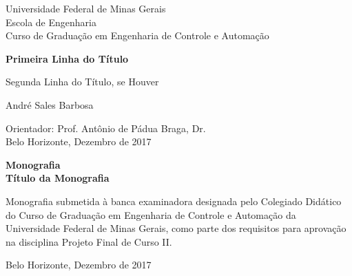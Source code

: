 \begin{titlepage}
\begin{center}
{\large Universidade Federal de Minas Gerais\\
Escola de Engenharia \\
Curso de Graduação em Engenharia de Controle e Automação\\}

\vspace{6cm}
{\bf\Large Primeira Linha do Título\vspace{0.2cm}

Segunda Linha do Título, se Houver}
\vspace{4cm}

{\large André Sales Barbosa}
\vspace{2cm}  
   
\vspace{2cm}          
{\large Orientador: Prof. Antônio de Pádua Braga, Dr.}\\


\vfill
{\large Belo Horizonte, Dezembro de 2017 }
\end{center}

\end{titlepage}

\newpage
\clearpage
\thispagestyle{empty}


\begin{titlepage}

\centering
\textbf{Monografia}\\
\vspace{2cm}
\centering
\textbf{Título da Monografia}\\
\vspace{5cm} 

\parbox{1.0\textwidth} 
{\large 
Monografia submetida à banca examinadora
designada pelo Colegiado Didático do Curso de
Graduação em Engenharia de Controle e
Automação da Universidade Federal de Minas
Gerais, como parte dos requisitos para aprovação na
disciplina Projeto Final de Curso II.}

\vspace{7cm} 
\centering
Belo Horizonte, Dezembro de 2017

\end{titlepage}

\clearpage
\thispagestyle{empty}
\cleardoublepage